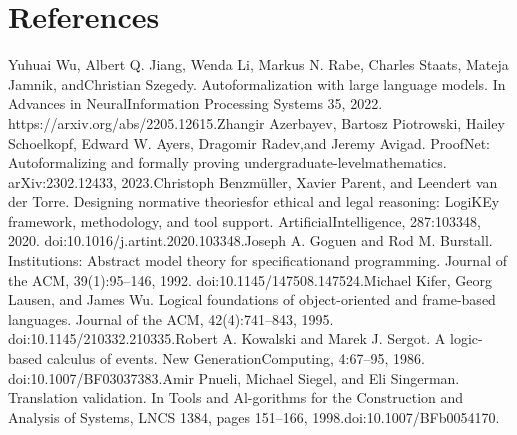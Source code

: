 \section*{References}
\noindent
[1] Yuhuai Wu, Albert Q. Jiang, Wenda Li, Markus N. Rabe, Charles Staats, Mateja Jamnik, and\linebreak[4]
Christian Szegedy. Autoformalization with large language models. In Advances in Neural\linebreak[4]
Information Processing Systems 35, 2022. https://arxiv.org/abs/2205.12615.\linebreak[4]
[2] Zhangir Azerbayev, Bartosz Piotrowski, Hailey Schoelkopf, Edward W. Ayers, Dragomir Radev,\linebreak[4]
and Jeremy Avigad. ProofNet: Autoformalizing and formally proving undergraduate-level\linebreak[4]
mathematics. arXiv:2302.12433, 2023.\linebreak[4]
[3] Christoph Benzm\"{u}ller, Xavier Parent, and Leendert van der Torre. Designing normative theories\linebreak[4]
for ethical and legal reasoning: LogiKEy framework, methodology, and tool support. Artificial\linebreak[4]
Intelligence, 287:103348, 2020. doi:10.1016/j.artint.2020.103348.\linebreak[4]
[4] Joseph A. Goguen and Rod M. Burstall. Institutions: Abstract model theory for specification\linebreak[4]
and programming. Journal of the ACM, 39(1):95--146, 1992. doi:10.1145/147508.147524.\linebreak[4]
[5] Michael Kifer, Georg Lausen, and James Wu. Logical foundations of object-oriented and frame-\linebreak[4]
based languages. Journal of the ACM, 42(4):741--843, 1995. doi:10.1145/210332.210335.\linebreak[4]
[6] Robert A. Kowalski and Marek J. Sergot. A logic-based calculus of events. New Generation\linebreak[4]
Computing, 4:67--95, 1986. doi:10.1007/BF03037383.\linebreak[4]
[7] Amir Pnueli, Michael Siegel, and Eli Singerman. Translation validation. In Tools and Al-\linebreak[4]
gorithms for the Construction and Analysis of Systems, LNCS 1384, pages 151--166, 1998.\linebreak[4]
doi:10.1007/BFb0054170.\linebreak[4]
